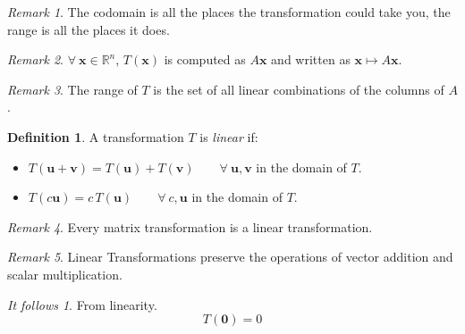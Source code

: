 \documentclass{article}
\renewcommand{\vec}[1]{\textbf{#1}}
\theoremstyle{definition}
\newtheorem{definition}{Definition}[section]
\theoremstyle{remark}
\newtheorem*{remark}{Remark}
\theoremstyle{remark}
\theoremstyle{remark}
\newtheorem*{it follows}{It follows}
\begin{document}
\begin{remark}
  The codomain is all the places the transformation could take you, the range is all the places it does.
\end{remark}

\begin{remark}
  $\forall\ \vec{x} \in \mathbb{R}^n$, $T(\vec{x})$ is computed as $A\vec{x}$ and written  as $\vec{x} \mapsto A\vec{x}$.
\end{remark}

\begin{remark}
  The range of $T$ is the set of all linear combinations of the columns of $A$.
\end{remark}

\begin{definition}
  A transformation $T$ is \textit{linear} if:
  \begin{itemize}
    \item $T(\vec{u} + \vec{v}) = T(\vec{u}) + T(\vec{v}) \qquad \forall\ \vec{u}, \vec{v}$ in the domain of $T$.
    \item $T(c\vec{u}) = c \, T(\vec{u}) \qquad \forall\ c, \vec{u}$ in the domain of $T$.
  \end{itemize}
\end{definition}

\begin{remark}
  Every matrix transformation is a linear transformation.
\end{remark}

\begin{remark}
  Linear Transformations preserve the operations of vector addition and scalar multiplication.
\end{remark}

\begin{it follows}
  From linearity.
  $$T(\vec{0}) = 0$$
\end{it follows}
\end{document}
